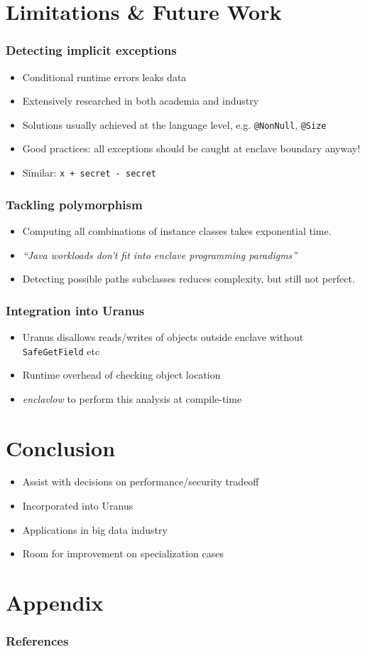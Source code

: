 \documentclass{beamer}
\newcommand{\code}[1]{\colorbox{code}{\texttt{\footnotesize #1}}}
\newcommand{\q}[1]{\enquote{#1}}
\begin{document}
\section{Limitations \& Future Work}
\begin{frame}
  \frametitle{Detecting implicit exceptions}
  \begin{itemize}
    \item Conditional runtime errors leaks data
    \item Extensively researched in both academia and industry
    \item Solutions usually achieved at the language level,
      e.g. \code{@NonNull}, \code{@Size}
    \item Good practices: all exceptions should be caught at enclave boundary anyway!
    \item Similar: \code{x + secret - secret}
  \end{itemize}
\end{frame}

\begin{frame}
  \frametitle{Tackling polymorphism}
  \begin{itemize}
    \item Computing all combinations of instance classes takes exponential time.
    \item \textit{\q{Java workloads don't fit into enclave programming paradigms}} \cite{civet}
    \item Detecting possible paths subclasses reduces complexity,
      but still not perfect.
  \end{itemize}
\end{frame}

\begin{frame}
  \frametitle{Integration into Uranus}
  \begin{itemize}
    \item Uranus disallows reads/writes of objects outside enclave
      without \code{SafeGetField} etc
    \item Runtime overhead of checking object location
    \item \textit{enclavlow} to perform this analysis at compile-time
  \end{itemize}
\end{frame}

\section{Conclusion}
\begin{frame}
  \begin{itemize}
    \item Assist with decisions on performance/security tradeoff
    \item Incorporated into Uranus
    \item Applications in big data industry
    \item Room for improvement on specialization cases
  \end{itemize}
\end{frame}

\section{Appendix}
\begin{frame}
  \frametitle{References}
  \scriptsize
  
  
\end{frame}
\end{document}
